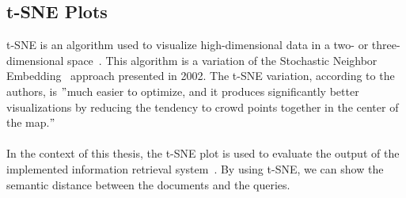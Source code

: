 \subsection{t-SNE Plots}\label{subsec:t-sne-plots}
t-SNE is an algorithm used to visualize high-dimensional data in a two- or three-dimensional space~\cite{maaten_visualizing_2008}.
This algorithm is a variation of the Stochastic Neighbor Embedding~\cite{hinton_stochastic_2002}
approach presented in 2002.
The t-SNE variation, according to the authors, is \("\)much easier to
optimize, and it produces significantly better visualizations by reducing the tendency to crowd
points together in the center of the map.\("\)~\cite{maaten_visualizing_2008} \\ \\
In the context of this thesis, the t-SNE plot is used to evaluate the output of the implemented
information retrieval system~\cite{peltonen_information_2015}.
By using t-SNE, we can show the semantic distance between the documents and the queries.
